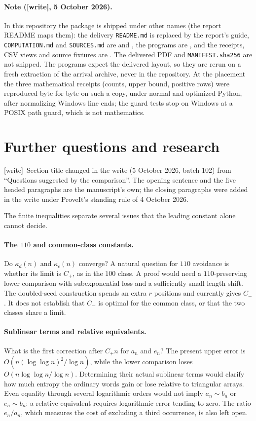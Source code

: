 \documentclass[11pt,letterpaper]{article}
\theoremstyle{remark}\newtheorem{remark}[theorem]{Remark}
\newcommand{\wtag}{\textup{[write]}}
\theoremstyle{remark}\newtheorem{wremark}{Remark}\renewcommand{\thewremark}{W\arabic{wremark}}
\theoremstyle{plain}\newtheorem{wcorollary}[wremark]{Corollary}
\begin{document}
\paragraph{Note (\wtag, 5 October 2026).} In this repository the package is
shipped under other names (the report README maps them): the delivery
\texttt{README.md} is replaced by the report's guide, \texttt{COMPUTATION.md}
and \texttt{SOURCES.md} are  and
, the programs are , and
the receipts, CSV views and source fixtures are . The
delivered PDF and \texttt{MANIFEST.sha256} are not shipped. The programs
expect the delivered layout, so they are rerun on a fresh extraction of the
arrival archive, never in the repository. At the placement the three
mathematical receipts (counts, upper bound, positive rows) were reproduced
byte for byte on such a copy, under normal and optimized Python, after
normalizing Windows line ends; the guard tests stop on Windows at a POSIX
path guard, which is not mathematics.
\section{Further questions and research}\label{a59:sec:questions}
\wtag\ Section title changed in the write (5 October 2026, batch 102) from
``Questions suggested by the comparison''. The opening sentence and the
five headed paragraphs are the manuscript's own; the closing paragraphs
were added in the write under ProveIt's standing rule of 4 October 2026.

The finite inequalities separate several issues that the leading constant alone cannot decide.

\paragraph{The $110$ and common-class constants.}
Do $\kappa_d(n)$ and $\kappa_c(n)$ converge? A natural question for $110$ avoidance is whether its limit is $C_+$, as in the $100$ class. A proof would need a $110$-preserving lower comparison with subexponential loss and a sufficiently small length shift. The doubled-seed construction spends an extra $r$ positions and currently gives $C_-$. It does not establish that $C_-$ is optimal for the common class, or that the two classes share a limit.

\paragraph{Sublinear terms and relative equivalents.}
What is the first correction after $C_+n$ for $a_n$ and $e_n$? The present upper error is $O(n(\log\log n)^2/\log n)$, while the lower comparison loses $O(n\log\log n/\log n)$. Determining their actual sublinear terms would clarify how much entropy the ordinary words gain or lose relative to triangular arrays. Even equality through several logarithmic orders would not imply $a_n\sim b_n$ or $e_n\sim b_n$: a relative equivalent requires logarithmic error tending to zero. The ratio $e_n/a_n$, which measures the cost of excluding a third occurrence, is also left open.
\end{document}
